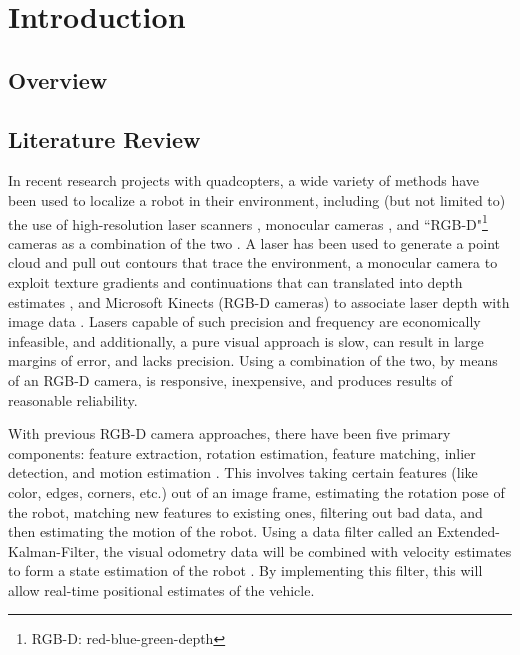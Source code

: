 \documentclass[letterpaper, oneside, 10pt]{report}
\begin{document}
\tableofcontents
\listoffigures
\listoftables
\clearpage

\chapter{Introduction}

\section{Overview}
\section{Literature Review}

In recent research projects with quadcopters, a wide variety of methods have been used to localize a robot in their environment, including (but not limited to) the use of high-resolution laser scanners \cite{bachrach2011range,shen2011autonomous}, monocular cameras \cite{soundararaj2009autonomous}, and ``RGB-D"\footnote{RGB-D: red-blue-green-depth} cameras as a combination of the two \cite{huang2011visual}. A laser has been used to generate a point cloud and pull out contours that trace the environment\cite{bachrach2011range}, a monocular camera to exploit texture gradients and continuations that can translated into depth estimates \cite{soundararaj2009autonomous}, and Microsoft Kinects (RGB-D cameras) to associate laser depth with image data \cite{huang2011visual}. Lasers capable of such precision and frequency are economically infeasible, and additionally, a pure visual approach is slow, can result in large margins of error, and lacks precision. Using a combination of the two, by means of an RGB-D camera, is responsive,  inexpensive, and produces results of reasonable reliability.


With previous RGB-D camera approaches, there have been five primary components: feature extraction, rotation estimation, feature matching, inlier detection, and motion estimation \cite{huang2011visual}. This involves taking certain features (like color, edges, corners, etc.) out of an image frame, estimating the rotation pose of the robot, matching new features to existing ones, filtering out bad data, and then estimating the motion of the robot. Using a data filter called an Extended-Kalman-Filter, the visual odometry data will be combined with velocity estimates to form a state estimation of the robot \cite{huang2011visual}. By implementing this filter, this will allow real-time positional estimates of the vehicle.
\end{document}
